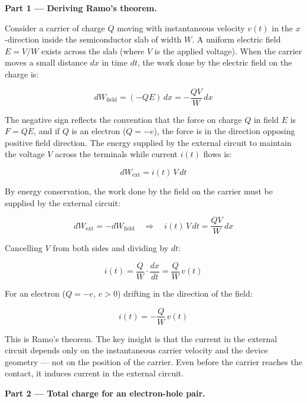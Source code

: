 \textbf{Part 1 — Deriving Ramo's theorem.}

Consider a carrier of charge $Q$ moving with instantaneous velocity $v(t)$ in the $x$-direction inside the semiconductor slab of width $W$. A uniform electric field $E = V/W$ exists across the slab (where $V$ is the applied voltage). When the carrier moves a small distance $dx$ in time $dt$, the work done by the electric field on the charge is:

\begin{equation*}
  dW_{\text{field}} = (-QE)\,dx = -\frac{QV}{W}\,dx
\end{equation*}

The negative sign reflects the convention that the force on charge $Q$ in field $E$ is $F = QE$, and if $Q$ is an electron ($Q = -e$), the force is in the direction opposing positive field direction. The energy supplied by the external circuit to maintain the voltage $V$ across the terminals while current $i(t)$ flows is:

\begin{equation*}
  dW_{\text{ext}} = i(t)\,V\,dt
\end{equation*}

By energy conservation, the work done by the field on the carrier must be supplied by the external circuit:

\begin{equation*}
  dW_{\text{ext}} = -dW_{\text{field}} \quad\Longrightarrow\quad i(t)\,V\,dt = \frac{QV}{W}\,dx
\end{equation*}

Cancelling $V$ from both sides and dividing by $dt$:

\begin{equation*}
  i(t) = \frac{Q}{W}\cdot\frac{dx}{dt} = \frac{Q}{W}\,v(t)
\end{equation*}

For an electron ($Q = -e$, $e > 0$) drifting in the direction of the field:

\begin{equation*}
  \boxed{i(t) = -\frac{Q}{W}\,v(t)}
\end{equation*}

This is Ramo's theorem. The key insight is that the current in the external circuit depends only on the instantaneous carrier velocity and the device geometry — not on the position of the carrier. Even before the carrier reaches the contact, it induces current in the external circuit.

\textbf{Part 2 — Total charge for an electron-hole pair.}

